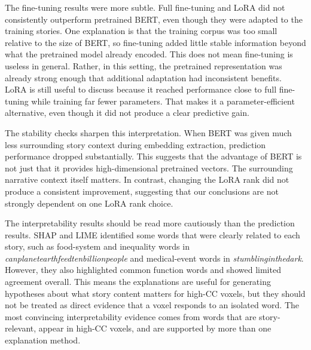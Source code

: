\documentclass[11pt]{article}
\begin{document}
The fine-tuning results were more subtle. Full fine-tuning and LoRA did not consistently outperform pretrained BERT, even though they were adapted to the training stories. One explanation is that the training corpus was too small relative to the size of BERT, so fine-tuning added little stable information beyond what the pretrained model already encoded. This does not mean fine-tuning is useless in general. Rather, in this setting, the pretrained representation was already strong enough that additional adaptation had inconsistent benefits. LoRA is still useful to discuss because it reached performance close to full fine-tuning while training far fewer parameters. That makes it a parameter-efficient alternative, even though it did not produce a clear predictive gain.

The stability checks sharpen this interpretation. When BERT was given much less surrounding story context during embedding extraction, prediction performance dropped substantially. This suggests that the advantage of BERT is not just that it provides high-dimensional pretrained vectors. The surrounding narrative context itself matters. In contrast, changing the LoRA rank did not produce a consistent improvement, suggesting that our conclusions are not strongly dependent on one LoRA rank choice.

The interpretability results should be read more cautiously than the prediction results. SHAP and LIME identified some words that were clearly related to each story, such as food-system and inequality words in \textit{canplanetearthfeedtenbillionpeople} and medical-event words in \textit{stumblinginthedark}. However, they also highlighted common function words and showed limited agreement overall. This means the explanations are useful for generating hypotheses about what story content matters for high-CC voxels, but they should not be treated as direct evidence that a voxel responds to an isolated word. The most convincing interpretability evidence comes from words that are story-relevant, appear in high-CC voxels, and are supported by more than one explanation method.
\end{document}
